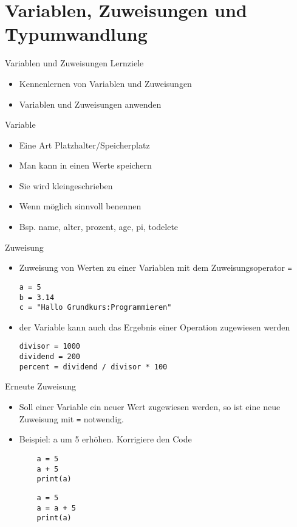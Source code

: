 \section{Variablen, Zuweisungen und Typumwandlung}

\begin{frame}[fragile]{Variablen und Zuweisungen}
Lernziele
\begin{itemize}
	\item Kennenlernen von Variablen und Zuweisungen
	\item Variablen und Zuweisungen anwenden

\end{itemize}
\end{frame}

\begin{frame}[fragile]{Variable}
\begin{itemize}
	\item Eine Art Platzhalter/Speicherplatz
	\item Man kann in einen Werte speichern
	\item Sie wird kleingeschrieben
	\item Wenn möglich sinnvoll benennen
	\item Bsp. name, alter, prozent, age, pi, todelete
	
\end{itemize}
\end{frame}


\begin{frame}[fragile]{Zuweisung}
\begin{itemize}
\item Zuweisung von Werten zu einer Variablen mit dem Zuweisungsoperator \texttt{=}
\begin{lstlisting}
a = 5
b = 3.14 
c = "Hallo Grundkurs:Programmieren"
\end{lstlisting}
\item der Variable kann auch das Ergebnis einer Operation zugewiesen werden
\begin{lstlisting}
divisor = 1000
dividend = 200
percent = dividend / divisor * 100
\end{lstlisting}

\end{itemize}
\end{frame}

\begin{frame}[fragile]{Erneute Zuweisung}
\begin{itemize}
	\item Soll einer Variable ein neuer Wert zugewiesen werden, so ist eine neue Zuweisung mit  \texttt{=} notwendig.
	\item Beispiel: a um 5 erhöhen. Korrigiere den Code
	\begin{lstlisting}
	a = 5
	a + 5
	print(a)
	\end{lstlisting}
	\pause{}
	\begin{lstlisting}
	a = 5
	a = a + 5
	print(a)
	\end{lstlisting}
	
\end{itemize}
\end{frame}



